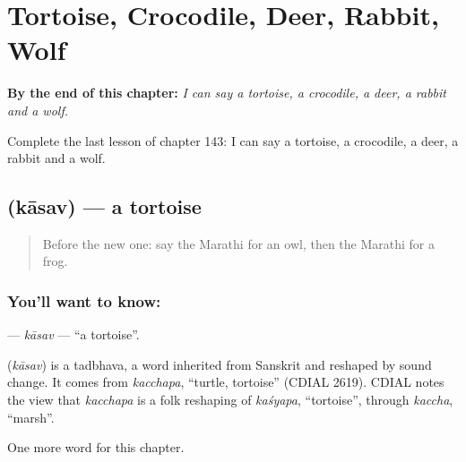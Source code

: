 
\chapter{Tortoise, Crocodile, Deer, Rabbit, Wolf}
\label{ch:mr-tortoise-crocodile-deer-rabbit-wolf}

\begin{chapteropening}
\textbf{By the end of this chapter:} \emph{I can say a tortoise, a crocodile, a deer, a rabbit and a wolf.}

Complete the last lesson of chapter 143: I can say a tortoise, a crocodile, a deer, a rabbit and a wolf.
\end{chapteropening}

\section[\texorpdfstring{\mr{कासव} (kāsav)}{कासव (kāsav)}]{ (kāsav) — a tortoise}

\label{lesson:MR-C143-kasav}



\begin{quote}
Before the new one: say the Marathi for an owl, then the Marathi for a frog.
\end{quote}

\subsection*{You'll want to know: }
\textbf{} — \emph{kāsav} — \textquotedblleft{}a tortoise\textquotedblright{}.

\begin{cousinweb}
\textbf{} (\emph{kāsav}) is a tadbhava, a word inherited from Sanskrit and reshaped by sound change. It comes from \emph{kacchapa}, \textquotedblleft{}turtle, tortoise\textquotedblright{} (CDIAL 2619). CDIAL notes the view that \emph{kacchapa} is a folk reshaping of \emph{kaśyapa}, \textquotedblleft{}tortoise\textquotedblright{}, through \emph{kaccha}, \textquotedblleft{}marsh\textquotedblright{}.
\end{cousinweb}

\begin{grammarlens}[title={What you've built}]
One more word for this chapter.
\end{grammarlens}

